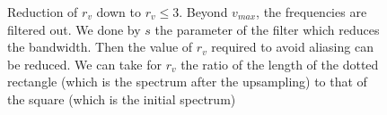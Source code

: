 		
		\begin{figure}
		\centering
		\caption{Reduction of $r_v$ down to $r_v \leq 3$. Beyond $v_{max}$, the frequencies are filtered out. We done by $s$ the parameter of the filter which reduces the bandwidth. Then the value of $r_v$ required to avoid aliasing can be reduced. We can take for $r_v$ the ratio of the length of the dotted rectangle (which is the spectrum after the upsampling) to that of the square (which is the initial spectrum)}
		\label{rvleq3}
		\end{figure}


